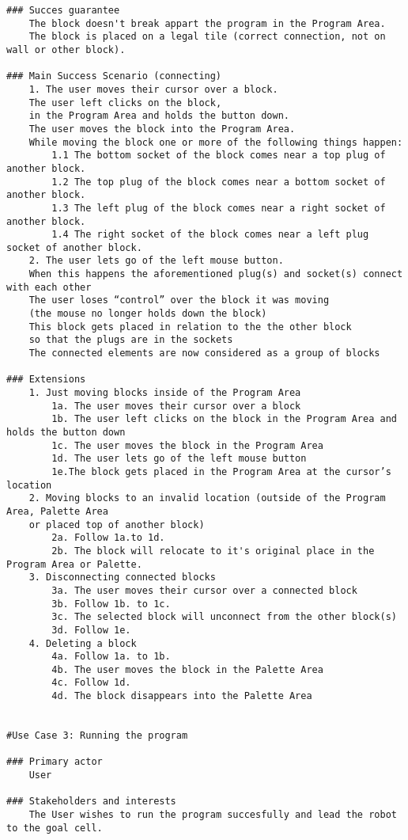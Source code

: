 \documentclass{article}
\begin{document}
\begin{verbatim}
### Succes guarantee
    The block doesn't break appart the program in the Program Area.
    The block is placed on a legal tile (correct connection, not on wall or other block).

### Main Success Scenario (connecting)
    1. The user moves their cursor over a block. 
    The user left clicks on the block, 
    in the Program Area and holds the button down. 
    The user moves the block into the Program Area.
    While moving the block one or more of the following things happen:
        1.1 The bottom socket of the block comes near a top plug of another block. 
        1.2 The top plug of the block comes near a bottom socket of another block.
        1.3 The left plug of the block comes near a right socket of another block.
        1.4 The right socket of the block comes near a left plug socket of another block. 
    2. The user lets go of the left mouse button. 
    When this happens the aforementioned plug(s) and socket(s) connect with each other
    The user loses “control” over the block it was moving
    (the mouse no longer holds down the block)
    This block gets placed in relation to the the other block 
    so that the plugs are in the sockets
    The connected elements are now considered as a group of blocks

### Extensions
    1. Just moving blocks inside of the Program Area
        1a. The user moves their cursor over a block
        1b. The user left clicks on the block in the Program Area and holds the button down
        1c. The user moves the block in the Program Area
        1d. The user lets go of the left mouse button 
        1e.The block gets placed in the Program Area at the cursor’s location
    2. Moving blocks to an invalid location (outside of the Program Area, Palette Area 
    or placed top of another block)
        2a. Follow 1a.to 1d.
        2b. The block will relocate to it's original place in the Program Area or Palette.
    3. Disconnecting connected blocks
        3a. The user moves their cursor over a connected block
        3b. Follow 1b. to 1c.
        3c. The selected block will unconnect from the other block(s)
        3d. Follow 1e.
    4. Deleting a block
        4a. Follow 1a. to 1b.
        4b. The user moves the block in the Palette Area
        4c. Follow 1d.
        4d. The block disappears into the Palette Area
  
    
#Use Case 3: Running the program

### Primary actor
    User
    
### Stakeholders and interests
    The User wishes to run the program succesfully and lead the robot to the goal cell.


\end{verbatim}
\end{document}
